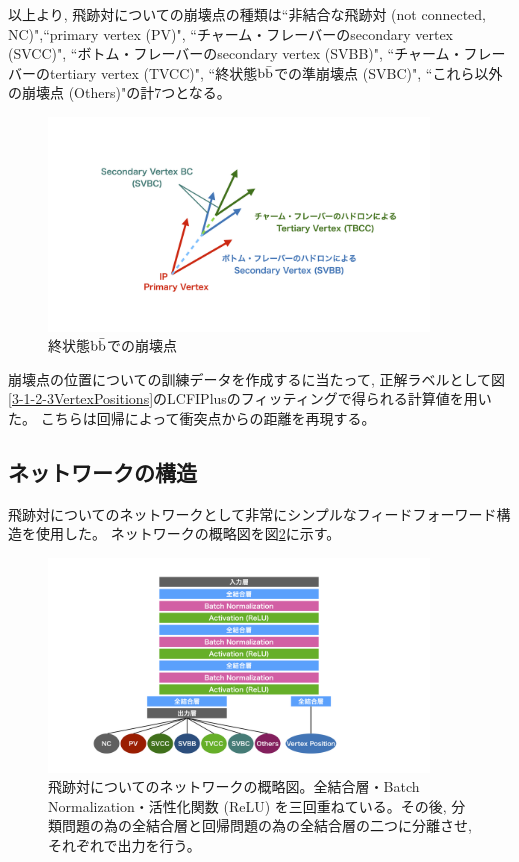 以上より, 飛跡対についての崩壊点の種類は``非結合な飛跡対 (not connected, NC)",``primary vertex (PV)", ``チャーム・フレーバーのsecondary vertex (SVCC)", ``ボトム・フレーバーのsecondary vertex (SVBB)", ``チャーム・フレーバーのtertiary vertex (TVCC)", ``終状態$\rm b\bar{b}$での準崩壊点 (SVBC)", ``これら以外の崩壊点 (Others)"の計$7$つとなる。

\begin{figure}[htbp]
 \centering
 \includegraphics[trim = 200 150 200 150, width=0.9\textwidth, clip]{Figure/3Networks/3-3-0-1SecondaryVertexBC.png}
 \caption{終状態$\rm b\bar{b}$での崩壊点}
 \label{3-3-0-1SecondaryVertexBC}
\end{figure}

崩壊点の位置についての訓練データを作成するに当たって, 正解ラベルとして図\ref{3-1-2-3VertexPositions}のLCFIPlusのフィッティングで得られる計算値を用いた。
こちらは回帰によって衝突点からの距離を再現する。


\subsection{ネットワークの構造} \label{Net:PM:StructureofPM}

飛跡対についてのネットワークとして非常にシンプルなフィードフォーワード構造を使用した。
ネットワークの概略図を図\ref{3-3-1-1PairModel}に示す。

\begin{figure}[htbp]
 \centering
 \includegraphics[trim = 200 50 200 50, width=0.9\textwidth, clip]{Figure/3Networks/3-3-1-1PairModel.png}
 \caption[飛跡対についてのネットワークの概略図]{飛跡対についてのネットワークの概略図。全結合層・Batch Normalization・活性化関数 (ReLU) を三回重ねている。その後, 分類問題の為の全結合層と回帰問題の為の全結合層の二つに分離させ, それぞれで出力を行う。}
 \label{3-3-1-1PairModel}
\end{figure}

